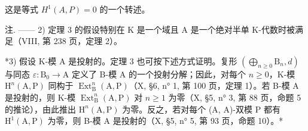 这是等式 \(H^{1}(A,P)=0\) 的一个转述。

注. —— 2) 定理 3 的假设特别在 K 是一个域且 A 是一个绝对半单 K-代数时被满足（VIII, 第 238 页，定理 2）。

*3) 假设 K-模 A 是投射的。定理 3 也可按下述方式证明。复形 \((\bigoplus_{n\geqslant 0}\mathrm{B}_n,d)\) 与同态 \(\varepsilon :\mathrm{B}_0\to \mathrm{A}\) 定义了 B-模 A 的一个投射分解；因此，对每个 \(n\geqslant 0\)，K-模 \(\mathrm{H}^n (\mathrm{A},\mathrm{P})\) 同构于 \(\operatorname {Ext}_{\mathrm{B}}^{n}(\mathrm{A},\mathrm{P})\)（X, §6, n° 1, 第 100 页，定理 1）。若 B-模 A 是投射的，则 K-模 \(\operatorname {Ext}_{\mathrm{B}}^{n}(\mathrm{A},\mathrm{P})\) 对 \(n\geqslant 1\) 为零（X, §5, n° 3, 第 88 页，命题 5 的推论），由此推出 \(\mathrm{H}^n (\mathrm{A},\mathrm{P})\) 为零。反之，若对每个 (A, A)-双模 P 都有 \(\mathrm{H}^1 (\mathrm{A},\mathrm{P})\) 为零，则 B-模 A 是投射的（X, §5, n° 5, 第 93 页，命题 10）。*


